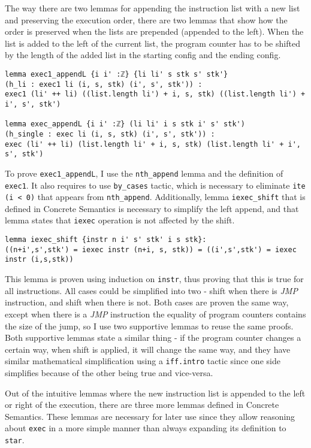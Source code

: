 The way there are two lemmas for appending the instruction list with a new list and preserving the execution order, there are two lemmas that show how the order is preserved when the lists are prepended (appended to the left). When the list is added to the left of the current list, the program counter has to be shifted by the length of the added list in the starting config and the ending config.
\begin{lstlisting}
lemma exec1_appendL {i i' :ℤ} {li li' s stk s' stk'}
(h_li : exec1 li (i, s, stk) (i', s', stk')) :
exec1 (li' ++ li) ((list.length li') + i, s, stk) ((list.length li') + i', s', stk')

lemma exec_appendL {i i' :ℤ} (li li' i s stk i' s' stk')
(h_single : exec li (i, s, stk) (i', s', stk')) :
exec (li' ++ li) (list.length li' + i, s, stk) (list.length li' + i', s', stk')
\end{lstlisting}
To prove \lstinline{exec1_appendL}, I use the \lstinline{nth_append} lemma and the definition of \lstinline{exec1}. It also requires to use \lstinline{by_cases} tactic, which is necessary to eliminate \lstinline{ite (i < 0)} that appears from \lstinline{nth_append}. Additionally, lemma \lstinline{iexec_shift} that is defined in Concrete Semantics is necessary to simplify the left append, and that lemma states that \lstinline{iexec} operation is not affected by the shift. 
\begin{lstlisting}
lemma iexec_shift {instr n i' s' stk' i s stk}:
((n+i',s',stk') = iexec instr (n+i, s, stk)) = ((i',s',stk') = iexec instr (i,s,stk))
\end{lstlisting}
This lemma is proven using induction on \lstinline{instr}, thus proving that this is true for all instructions. All cases could be simplified into two - shift when there is \emph{JMP} instruction, and shift when there is not. Both cases are proven the same way, except when there is a \emph{JMP} instruction the equality of program counters contains the size of the jump, so I use two supportive lemmas to reuse the same proofs. Both supportive lemmas state a similar thing - if the program counter changes a certain way, when shift is applied, it will change the same way, and they have similar mathematical simplification using a \lstinline{iff.intro} tactic since one side simplifies because of the other being true and vice-versa.

Out of the intuitive lemmas where the new instruction list is appended to the left or right of the execution, there are three more lemmas defined in Concrete Semantics. These lemmas are necessary for later use since they allow reasoning about \lstinline{exec} in a more simple manner than always expanding its definition to \lstinline{star}. 

